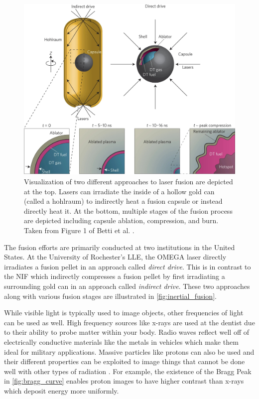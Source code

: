\begin{figure}
	\centering
	\includegraphics[width=0.9\linewidth]{planning/images/fusion.png}
	\caption{Visualization of two different approaches to laser fusion are depicted at the top. Lasers can irradiate the inside of a hollow gold can (called a hohlraum) to indirectly heat a fusion capsule or instead directly heat it. At the bottom, multiple stages of the fusion process are depicted including capsule ablation, compression, and burn. Taken from Figure 1 of Betti et al. \cite{Betti_2016_Nature}. }
	\label{fig:inertial_fusion}
\end{figure}

The fusion efforts are primarily conducted at two institutions in the United States. At the University of Rochester's \gls{LLE}, the OMEGA laser directly irradiates a fusion pellet in an approach called \emph{direct drive}. This is in contrast to the \gls{NIF} which indirectly compresses a fusion pellet by first irradiating a surrounding gold can in an approach called \emph{indirect drive}. These two approaches along with various fusion stages are illustrated in \autoref{fig:inertial_fusion}.

While visible light is typically used to image objects, other frequencies of light can be used as well. High frequency sources like x-rays are used at the dentist due to their ability to probe matter within your body. Radio waves reflect well off of electrically conductive materials like the metals in vehicles which make them ideal for military applications. Massive particles like protons can also be used and their different properties can be exploited to image things that cannot be done well with other types of radiation \cite{Schaeffer_2023_RevMod}. For example, the existence of the Bragg Peak in \autoref{fig:bragg_curve} enables proton images to have higher contrast than x-rays which deposit energy more uniformly.
 

